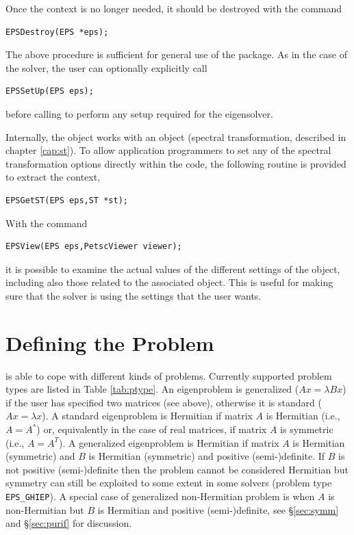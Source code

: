 	Once the  context is no longer needed, it should be destroyed with the command
	\begin{Verbatim}[fontsize=\small]
	EPSDestroy(EPS *eps);
	\end{Verbatim}

	The above procedure is sufficient for general use of the  package. As in the case of the  solver, the user can optionally explicitly call
	\begin{Verbatim}[fontsize=\small]
	EPSSetUp(EPS eps);
	\end{Verbatim}
before calling  to perform any setup required for the eigensolver.

	Internally, the  object works with an  object (spectral transformation, described in chapter \ref{cap:st}). To allow application programmers to set any of the spectral transformation options directly within the code, the following routine is provided to extract the  context,
	\begin{Verbatim}[fontsize=\small]
	EPSGetST(EPS eps,ST *st);
	\end{Verbatim}
	
	With the command
	\begin{Verbatim}[fontsize=\small]
	EPSView(EPS eps,PetscViewer viewer);
	\end{Verbatim}
it is possible to examine the actual values of the different settings of the  object, including also those related to the associated  object. This is useful for making sure that the solver is using the settings that the user wants.

\section{Defining the Problem}
\label{sec:defprob}

	\slepc is able to cope with different kinds of problems. Currently supported problem types are listed in Table \ref{tab:ptype}. An eigenproblem is generalized ($Ax=\lambda Bx$) if the user has specified two matrices (see  above), otherwise it is standard ($Ax=\lambda x$). A standard eigenproblem is Hermitian if matrix $A$ is Hermitian (i.e., $A=A^*$) or, equivalently in the case of real matrices, if matrix $A$ is symmetric (i.e., $A=A^T$). A generalized eigenproblem is Hermitian if matrix $A$ is Hermitian (symmetric) and $B$ is Hermitian (symmetric) and positive (semi-)definite.
If $B$ is not positive (semi-)definite then the problem cannot be considered Hermitian but symmetry can still be exploited to some extent in some solvers (problem type \texttt{EPS\_GHIEP}).
A special case of generalized non-Hermitian problem is when $A$ is non-Hermitian but $B$ is Hermitian and positive (semi-)definite, see \S\ref{sec:symm} and \S\ref{sec:purif} for discussion.

